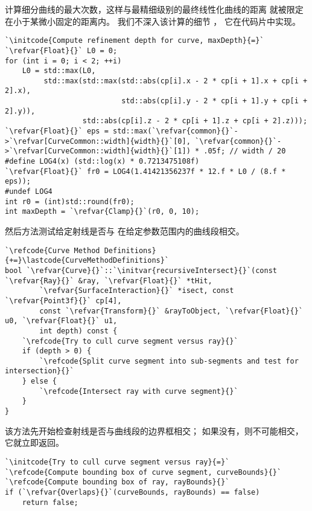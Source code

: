 计算细分曲线的最大次数，这样与最精细级别的最终线性化曲线的距离
就被限定在小于某微小固定的距离内。
我们不深入该计算的细节
，
它在代码片中实现。
\begin{lstlisting}
`\initcode{Compute refinement depth for curve, maxDepth}{=}`
`\refvar{Float}{}` L0 = 0;
for (int i = 0; i < 2; ++i)
    L0 = std::max(L0,
         std::max(std::max(std::abs(cp[i].x - 2 * cp[i + 1].x + cp[i + 2].x),
                           std::abs(cp[i].y - 2 * cp[i + 1].y + cp[i + 2].y)),
                  std::abs(cp[i].z - 2 * cp[i + 1].z + cp[i + 2].z)));
`\refvar{Float}{}` eps = std::max(`\refvar{common}{}`->`\refvar[CurveCommon::width]{width}{}`[0], `\refvar{common}{}`->`\refvar[CurveCommon::width]{width}{}`[1]) * .05f; // width / 20
#define LOG4(x) (std::log(x) * 0.7213475108f)
`\refvar{Float}{}` fr0 = LOG4(1.41421356237f * 12.f * L0 / (8.f * eps));
#undef LOG4
int r0 = (int)std::round(fr0);
int maxDepth = `\refvar{Clamp}{}`(r0, 0, 10);
\end{lstlisting}

然后方法测试给定射线是否与
在给定参数范围{\ttfamily [u0,u1]}内的曲线段相交。
\begin{lstlisting}
`\refcode{Curve Method Definitions}{+=}\lastcode{CurveMethodDefinitions}`
bool `\refvar{Curve}{}`::`\initvar{recursiveIntersect}{}`(const `\refvar{Ray}{}` &ray, `\refvar{Float}{}` *tHit,
        `\refvar{SurfaceInteraction}{}` *isect, const `\refvar{Point3f}{}` cp[4],
        const `\refvar{Transform}{}` &rayToObject, `\refvar{Float}{}` u0, `\refvar{Float}{}` u1,
        int depth) const {
    `\refcode{Try to cull curve segment versus ray}{}`
    if (depth > 0) {
        `\refcode{Split curve segment into sub-segments and test for intersection}{}`
    } else {
        `\refcode{Intersect ray with curve segment}{}`
    }
}
\end{lstlisting}

该方法先开始检查射线是否与曲线段的边界框相交；
如果没有，则不可能相交，它就立即返回。
\begin{lstlisting}
`\initcode{Try to cull curve segment versus ray}{=}`
`\refcode{Compute bounding box of curve segment, curveBounds}{}`
`\refcode{Compute bounding box of ray, rayBounds}{}`
if (`\refvar{Overlaps}{}`(curveBounds, rayBounds) == false)
    return false;
\end{lstlisting}

